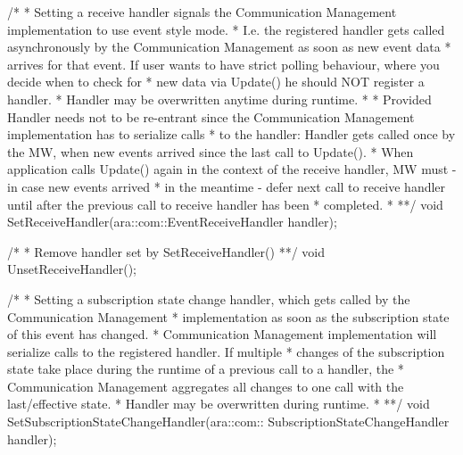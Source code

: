 \begin{DoxyCode}
   \textcolor{comment}{/*}
\textcolor{comment}{   * Setting a receive handler signals the Communication Management }
\textcolor{comment}{     implementation to use event style mode.}
\textcolor{comment}{   * I.e. the registered handler gets called asynchronously by the}
\textcolor{comment}{     Communication Management as soon as new event data}
\textcolor{comment}{   * arrives for that event. If user wants to have strict polling behaviour,}
\textcolor{comment}{     where you decide when to check for}
\textcolor{comment}{   * new data via Update() he should NOT register a handler.}
\textcolor{comment}{   * Handler may be overwritten anytime during runtime.}
\textcolor{comment}{   *}
\textcolor{comment}{   * Provided Handler needs not to be re-entrant since the Communication}
\textcolor{comment}{     Management implementation has to serialize calls}
\textcolor{comment}{   * to the handler: Handler gets called once by the MW, when new events}
\textcolor{comment}{     arrived since the last call to Update().}
\textcolor{comment}{   * When application calls Update() again in the context of the receive}
\textcolor{comment}{     handler, MW must - in case new events arrived}
\textcolor{comment}{   * in the meantime - defer next call to receive handler until after the}
\textcolor{comment}{     previous call to receive handler has been}
\textcolor{comment}{   * completed.}
\textcolor{comment}{   *}
\textcolor{comment}{   **/}
   \textcolor{keywordtype}{void} SetReceiveHandler(ara::com::EventReceiveHandler handler);

   \textcolor{comment}{/*}
\textcolor{comment}{   * Remove handler set by SetReceiveHandler()}
\textcolor{comment}{   **/}
   \textcolor{keywordtype}{void} UnsetReceiveHandler();

   \textcolor{comment}{/*}
\textcolor{comment}{   * Setting a subscription state change handler, which gets called by}
\textcolor{comment}{     the Communication Management}
\textcolor{comment}{   * implementation as soon as the subscription state of this event has}
\textcolor{comment}{     changed.}
\textcolor{comment}{   * Communication Management implementation will serialize calls to the}
\textcolor{comment}{     registered handler. If multiple}
\textcolor{comment}{   * changes of the subscription state take place during the runtime of a}
\textcolor{comment}{     previous call to a handler, the}
\textcolor{comment}{   * Communication Management aggregates all changes to one call with the}
\textcolor{comment}{     last/effective state.}
\textcolor{comment}{   * Handler may be overwritten during runtime.}
\textcolor{comment}{   *}
\textcolor{comment}{   **/}
   \textcolor{keywordtype}{void}  SetSubscriptionStateChangeHandler(ara::com:: SubscriptionStateChangeHandler   handler);


\end{DoxyCode}
